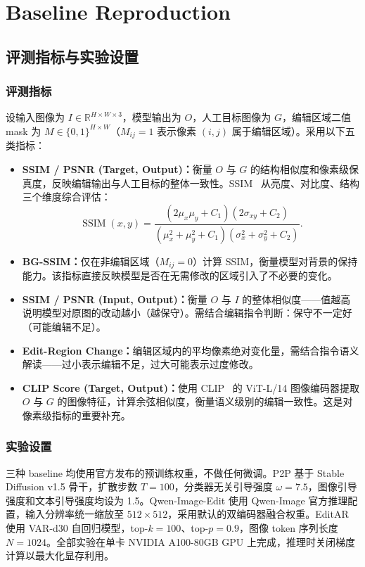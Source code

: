 \documentclass[UTF8,11pt,a4paper,fontset=fandol]{ctexart}
\begin{document}
\section{Baseline Reproduction}

\subsection{评测指标与实验设置}

\subsubsection{评测指标}

设输入图像为 $I\in\mathbb{R}^{H\times W\times 3}$，模型输出为 $O$，人工目标图像为 $G$，编辑区域二值 mask 为 $M\in\{0,1\}^{H\times W}$（$M_{ij}=1$ 表示像素 $(i,j)$ 属于编辑区域）。采用以下五类指标：
\begin{itemize}
  \item \textbf{SSIM / PSNR (Target, Output)：}衡量 $O$ 与 $G$ 的结构相似度和像素级保真度，反映编辑输出与人工目标的整体一致性。SSIM~\cite{ssim} 从亮度、对比度、结构三个维度综合评估：
\[
\operatorname{SSIM}(x,y)=
\frac{(2\mu_x\mu_y+C_1)(2\sigma_{xy}+C_2)}
{(\mu_x^2+\mu_y^2+C_1)(\sigma_x^2+\sigma_y^2+C_2)}.
\]
  \item \textbf{BG-SSIM：}仅在非编辑区域（$M_{ij}=0$）计算 SSIM，衡量模型对背景的保持能力。该指标直接反映模型是否在无需修改的区域引入了不必要的变化。
  \item \textbf{SSIM / PSNR (Input, Output)：}衡量 $O$ 与 $I$ 的整体相似度——值越高说明模型对原图的改动越小（越保守）。需结合编辑指令判断：保守不一定好（可能编辑不足）。
  \item \textbf{Edit-Region Change：}编辑区域内的平均像素绝对变化量，需结合指令语义解读——过小表示编辑不足，过大可能表示过度修改。
  \item \textbf{CLIP Score (Target, Output)：}使用 CLIP~\cite{clip} 的 ViT-L/14 图像编码器提取 $O$ 与 $G$ 的图像特征，计算余弦相似度，衡量语义级别的编辑一致性。这是对像素级指标的重要补充。
\end{itemize}

\subsubsection{实验设置}

三种 baseline 均使用官方发布的预训练权重，不做任何微调。P2P 基于 Stable Diffusion v1.5 骨干，扩散步数 $T=100$，分类器无关引导强度 $\omega=7.5$，图像引导强度和文本引导强度均设为 1.5。Qwen-Image-Edit 使用 Qwen-Image 官方推理配置，输入分辨率统一缩放至 $512\times512$，采用默认的双编码器融合权重。EditAR 使用 VAR-d30 自回归模型，top-$k=100$、top-$p=0.9$，图像 token 序列长度 $N=1024$。全部实验在单卡 NVIDIA A100-80GB GPU 上完成，推理时关闭梯度计算以最大化显存利用。
\end{document}
